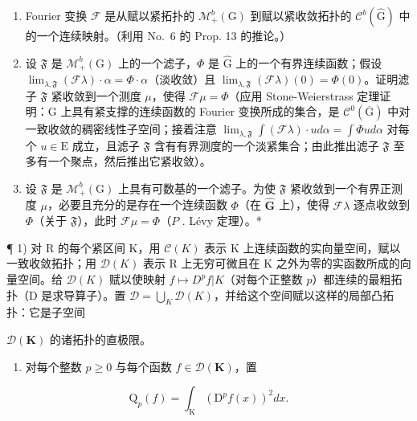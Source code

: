 \begin{enumerate}
\def\labelenumi{\alph{enumi})}
\item
  Fourier 变换 \(\mathcal{F}\) 是从赋以紧拓扑的 \(\mathcal{M}_{+}^{b}(\mathrm{G})\) 到赋以紧收敛拓扑的 \(\mathcal{C}^b (\widehat{\mathrm{G}})\) 中的一个连续映射。（利用 No.~6 的 Prop. 13 的推论。）
\item
  设 \(\mathfrak{F}\) 是 \(\mathcal{M}_+^b (\mathrm{G})\) 上的一个滤子，\(\Phi\) 是 \(\widehat{\mathrm{G}}\) 上的一个有界连续函数；假设 \(\lim_{\lambda ,\mathfrak{F}}(\mathcal{F}\lambda)\cdot \alpha = \Phi \cdot \alpha\)（淡收敛）且 \(\lim_{\lambda ,\mathfrak{F}}(\mathcal{F}\lambda)(0) = \Phi (0)\)。证明滤子 \(\mathfrak{F}\) 紧收敛到一个测度 \(\mu\)，使得 \(\mathcal{F}\mu = \Phi\)（应用 Stone-Weierstrass 定理证明：G 上具有紧支撑的连续函数的 Fourier 变换所成的集合，是 \(\mathcal{C}^0 (\overline{\mathrm{G}})\) 中对一致收敛的稠密线性子空间；接着注意 \(\lim_{\lambda ,\mathfrak{F}}\int (\mathcal{F}\lambda)\cdot u d\alpha = \int \Phi u d\alpha\) 对每个 \(u\in \mathrm{E}\) 成立，且滤子 \(\mathfrak{F}\) 含有有界测度的一个淡紧集合；由此推出滤子 \(\mathfrak{F}\) 至多有一个聚点，然后推出它紧收敛）。
\item
  设 \(\mathfrak{F}\) 是 \(\mathcal{M}_{+}^{b}(\mathrm{G})\) 上具有可数基的一个滤子。为使 \(\mathfrak{F}\) 紧收敛到一个有界正测度 \(\mu\)，必要且充分的是存在一个连续函数 \(\Phi\)（在 \(\widehat{\mathbf{G}}\) 上），使得 \(\mathcal{F}\lambda\) 逐点收敛到 \(\Phi\)（关于 \(\mathfrak{F}\)），此时 \(\mathcal{F}\mu = \Phi\)（\(P\) . Lévy 定理）。*
\end{enumerate}

\exercisesection{}

¶ 1) 对 R 的每个紧区间 K，用 \(\mathcal{C}(K)\) 表示 K 上连续函数的实向量空间，赋以一致收敛拓扑；用 \(\mathcal{D}(K)\) 表示 R 上无穷可微且在 K 之外为零的实函数所成的向量空间。给 \(\mathcal{D}(K)\) 赋以使映射 \(f \mapsto D^{p}f|K\)（对每个正整数 \(p\)）都连续的最粗拓扑（D 是求导算子）。置 \(\mathcal{D} = \bigcup_{K} \mathcal{D}(K)\)，并给这个空间赋以这样的局部凸拓扑：它是子空间

\(\mathcal{D}(\mathbf{K})\) 的诸拓扑的直极限。

\begin{enumerate}
\def\labelenumi{\alph{enumi})}
\tightlist
\item
  对每个整数 \(p \geqslant 0\) 与每个函数 \(f \in \mathcal{D}(\mathbf{K})\)，置
\end{enumerate}

\[
\mathrm{Q} _ {p} (f) = \int_ {\mathrm{K}} \left(\mathrm{D} ^ {p} f (x)\right) ^ {2} d x.
\]

